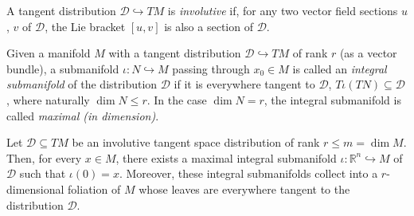 \begin{definition} \label{def:inv-distr}
A tangent distribution $\mathcal{D} \hookrightarrow TM$ is \emph{involutive} if,
for any two vector field sections $u$, $v$ of $\mathcal{D}$, the Lie bracket
$[u,v]$ is also a section of $\mathcal{D}$.
\end{definition}

\begin{definition} \label{def:int-subman}
Given a manifold $M$ with a tangent distribution $\mathcal{D} \hookrightarrow
TM$ of rank $r$ (as a vector bundle), a submanifold $\iota\colon N
\hookrightarrow M$ passing through $x_0 \in M$ is called an \emph{integral
submanifold} of the distribution $\mathcal{D}$ if it is everywhere tangent to
$\mathcal{D}$, $T\iota (TN) \subseteq \mathcal{D}$, where naturally $\dim N \le
r$. In the case $\dim N = r$, the integral submanifold is called \emph{maximal
(in dimension)}.
\end{definition}

\begin{definition}[foliation] \label{def:foliation}
\notready
\end{definition}

\begin{theorem} \label{thm:frob-vec}
Let $\mathcal{D} \subseteq TM$ be an involutive tangent space distribution of
rank $r\le m = \dim M$. Then, for every $x\in M$, there exists a maximal
integral submanifold $\iota\colon \mathbb{R}^n \hookrightarrow M$ of
$\mathcal{D}$ such that $\iota(0) = x$. Moreover, these integral submanifolds
collect into a $r$-dimensional foliation of $M$ whose leaves are everywhere
tangent to the distribution $\mathcal{D}$.
\end{theorem}
